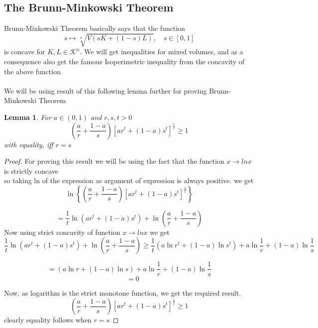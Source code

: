\documentclass[oneside]{book}
\newtheorem{lemma}[theorem]{Lemma}
\begin{document}
	\subsection{The Brunn-Minkowski Theorem}
	\label{ss:21}
	Brunn-Minkowski Theorem  basically says that the function 
	\[s  \mapsto \sqrt[n]{V(s K+(1- s) L)}, \quad s \in[0,1]
	\]
	is concave for $ K, L \in \mathcal{K}^n $.
	We will get inequalities for mixed volumes, and as a consequence also get the famous Isoperimetric inequality from the concavity of the above function
	\\\\
	We will be using result of this following lemma further for proving Brunn-Minkowski Theorem
	\begin{lemma} 
		\label{l:2}
		For $a \in(0,1)$ and $r, s, t>0$
		\[
		\left(\frac{a}{r}+\frac{1-a}{s}\right)\left[a r^{t}+(1-a) s^{t}\right]^{\frac{1}{t}} \geq 1
		\]
		with equality, iff $r=s$
	\end{lemma} 
	\begin{proof}
		
		For proving this result we will be using the fact that the function $x \rightarrow lnx $ is strictly concave \\
		so taking ln of the expression as argument of expression is always positive. we get 
		$$\ln \left\{\left(\frac{a}{r}+\frac{1-a}{s}\right)\left[a r^{t}+(1-a) s^{t}\right]^{\frac{1}{t}}\right\}$$
		
		$$ =\frac{1}{t} \ln \left(a r^{t}+(1-a) s^{t}\right)+\ln \left(\frac{a}{r}+\frac{1-a}{s}\right)$$
		Now using strict concavity of  function  $x \rightarrow lnx $ we get 
		$$\frac{1}{t} \ln \left(a r^{t}+(1-a) s^{t}\right)+\ln \left(\frac{a}{r}+\frac{1-a}{s}\right)
		\geq \frac{1}{t}\left(a \ln r^{t}+(1-a) \ln s^{t}\right)+a \ln \frac{1}{r}+(1-a) \ln \frac{1}{s}$$
		
		
		$$ =  \left(a \ln r+(1-a) \ln s\right)+a \ln \frac{1}{r}+(1-a) \ln \frac{1}{s}$$
		$$\quad = 0$$
		
		Now, as logarithm is the strict monotone function, we get the required result. 
		\[
		\left(\frac{a}{r}+\frac{1-a}{s}\right)\left[a r^{t}+(1-a) s^{t}\right]^{\frac{1}{t}} \geq 1
		\]
		clearly equality follows when $r = s $
	\end{proof}
	
	
	
	
	
	
	
	
	
\end{document}
